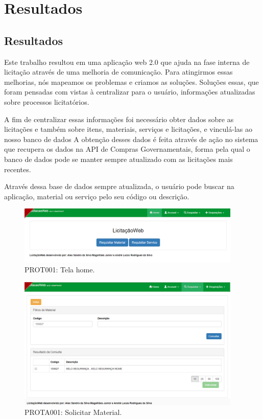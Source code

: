\part{Resultados}

\chapter[Resultados]{Resultados}\label{Capitulo5}

Este trabalho resultou em uma aplicação web 2.0 que ajuda na fase interna de licitação através de uma melhoria de comunicação.
Para atingirmos essas melhorias, nós mapeamos os problemas e criamos as soluções.
Soluções essas, que foram pensadas com vistas à centralizar para o usuário, informações atualizadas sobre processos licitatórios.

A fim de centralizar essas informações foi necessário obter dados sobre as licitações e também sobre itens, materiais, serviços e licitações, e vinculá-las ao nosso banco de dados
A obtenção desses dados é feita através de ação no sistema que recupera os dados na API de Compras Governamentais, forma pela qual o banco de dados pode se manter sempre atualizado com as licitações mais recentes.

Através dessa base de dados sempre atualizada, o usuário pode buscar na aplicação, material ou serviço pelo seu código ou descrição.

\begin{figure}[H]
	\centering
	\includegraphics[width=0.95\textwidth]{figuras/prototipo001.png}
	\caption[PROT001: Tela home]{PROT001: Tela home.}
\end{figure}

\begin{figure}[H]
	\centering
	\includegraphics[width=0.95\textwidth]{figuras/prototipoA001.png}
	\caption[PROTA001: Solicitar Material]{PROTA001: Solicitar Material.}
\end{figure}

